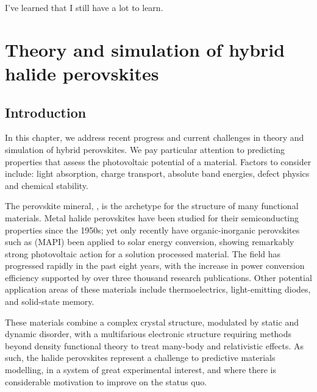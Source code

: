 \begin{savequote}[8cm]
I've learned that I still have a lot to learn.
\end{savequote}

\chapter{\label{ch:2-litreview}Theory and simulation of hybrid halide perovskites}

\section{Introduction}

In this chapter, we address recent progress and current challenges in theory and simulation of hybrid perovskites. 
We pay particular attention to predicting properties that assess the photovoltaic potential of a material. 
Factors to consider include: light absorption, charge transport, absolute band energies, defect physics and chemical stability. 

The perovskite mineral, , is the archetype for the structure of many functional materials.\autocite{Schaak2002}
Metal halide perovskites have been studied for their semiconducting properties since the 1950s\autocite{Moller1958}; 
yet only recently have organic-inorganic perovskites such as  (MAPI) been applied to solar energy conversion, showing remarkably strong photovoltaic action for a solution processed material.\autocite{Kojima2009}
The field has progressed rapidly in the past eight years, with the increase in power conversion efficiency supported by over three thousand research publications.\autocite{Stranks2015b,Saparov2016b,Park2016,Walsh2016,Wallace2017}
Other potential application areas of these materials include 
thermoelectrics,\autocite{He2014,Mettan2015}
light-emitting diodes,\autocite{Protesescu2015,Stranks2015b}
and
solid-state memory.\autocite{Yoo2015a,Liu2017}

These materials combine a complex crystal structure, modulated by static and dynamic disorder, with a multifarious electronic structure requiring methods beyond density functional theory to treat many-body and relativistic effects. 
As such, the halide perovskites represent a challenge to predictive materials modelling, in a system of great experimental interest, and where there is considerable motivation to improve on the status quo. 

